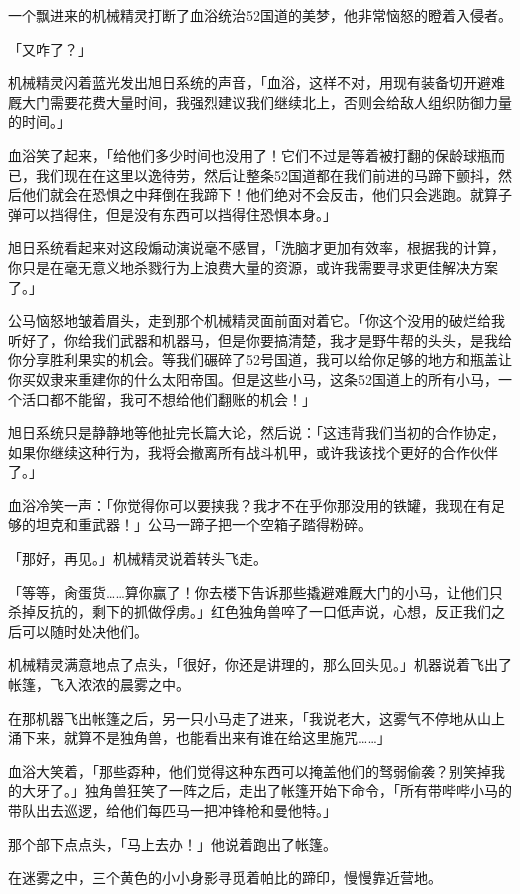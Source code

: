一个飘进来的机械精灵打断了血浴统治52国道的美梦，他非常恼怒的瞪着入侵者。

「又咋了？」

机械精灵闪着蓝光发出旭日系统的声音，「血浴，这样不对，用现有装备切开避难厩大门需要花费大量时间，我强烈建议我们继续北上，否则会给敌人组织防御力量的时间。」

血浴笑了起来，「给他们多少时间也没用了！它们不过是等着被打翻的保龄球瓶而已，我们现在在这里以逸待劳，然后让整条52国道都在我们前进的马蹄下颤抖，然后他们就会在恐惧之中拜倒在我蹄下！他们绝对不会反击，他们只会逃跑。就算子弹可以挡得住，但是没有东西可以挡得住恐惧本身。」

旭日系统看起来对这段煽动演说毫不感冒，「洗脑才更加有效率，根据我的计算，你只是在毫无意义地杀戮行为上浪费大量的资源，或许我需要寻求更佳解决方案了。」

公马恼怒地皱着眉头，走到那个机械精灵面前面对着它。「你这个没用的破烂给我听好了，你给我们武器和机器马，但是你要搞清楚，我才是野牛帮的头头，是我给你分享胜利果实的机会。等我们碾碎了52号国道，我可以给你足够的地方和瓶盖让你买奴隶来重建你的什么太阳帝国。但是这些小马，这条52国道上的所有小马，一个活口都不能留，我可不想给他们翻账的机会！」

旭日系统只是静静地等他扯完长篇大论，然后说：「这违背我们当初的合作协定，如果你继续这种行为，我将会撤离所有战斗机甲，或许我该找个更好的合作伙伴了。」

血浴冷笑一声：「你觉得你可以要挟我？我才不在乎你那没用的铁罐，我现在有足够的坦克和重武器！」公马一蹄子把一个空箱子踏得粉碎。

「那好，再见。」机械精灵说着转头飞走。

「等等，肏蛋货……算你赢了！你去楼下告诉那些撬避难厩大门的小马，让他们只杀掉反抗的，剩下的抓做俘虏。」红色独角兽啐了一口低声说，心想，反正我们之后可以随时处决他们。

机械精灵满意地点了点头，「很好，你还是讲理的，那么回头见。」机器说着飞出了帐篷，飞入浓浓的晨雾之中。

在那机器飞出帐篷之后，另一只小马走了进来，「我说老大，这雾气不停地从山上涌下来，就算不是独角兽，也能看出来有谁在给这里施咒……」

血浴大笑着，「那些孬种，他们觉得这种东西可以掩盖他们的驽弱偷袭？别笑掉我的大牙了。」独角兽狂笑了一阵之后，走出了帐篷开始下命令，「所有带哔哔小马的带队出去巡逻，给他们每匹马一把冲锋枪和曼他特。」

那个部下点点头，「马上去办！」他说着跑出了帐篷。

在迷雾之中，三个黄色的小小身影寻觅着帕比的蹄印，慢慢靠近营地。

